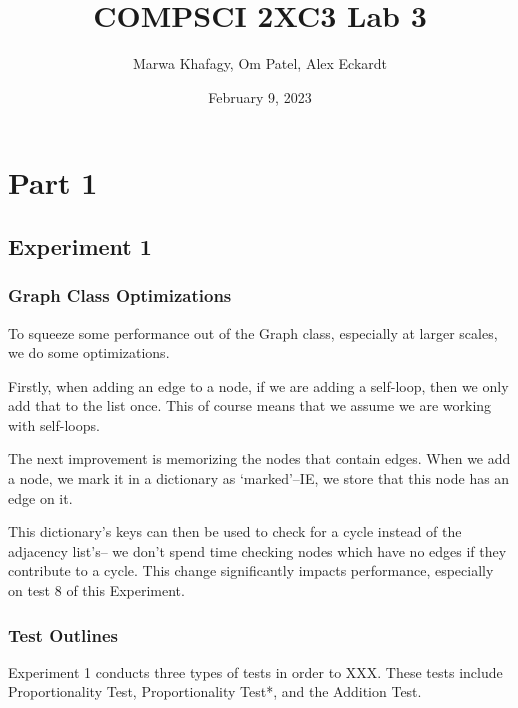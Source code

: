 \documentclass[12pt]{article}
\title{COMPSCI 2XC3 Lab 3}
\author{Marwa Khafagy, Om Patel, Alex Eckardt}
\date{February 9, 2023}
\begin{document}
\maketitle

\newpage
\tableofcontents

\newpage
\listoffigures


%
%
%
%
\newpage
\section{Part 1}
\subsection{Experiment 1}

\subsubsection{Graph Class Optimizations}

To squeeze some performance out of the Graph class, especially at larger scales, we do some optimizations.

Firstly, when adding an edge to a node, if we are adding a self-loop, then we only add that to the list once. This of course means that we assume we are working with self-loops.

The next improvement is memorizing the nodes that contain edges. When we add a node, we mark it in a dictionary as `marked'--IE, we store that this node has an edge on it.

This dictionary's keys can then be used to check for a cycle instead of the adjacency list's-- we don't spend time checking nodes which have no edges if they contribute to a cycle. This change significantly impacts performance, especially on test 8 of this Experiment.

\subsubsection{Test Outlines}

Experiment 1 conducts three types of tests in order to XXX\@. These tests include Proportionality Test, Proportionality Test*, and the Addition Test.
\end{document}
